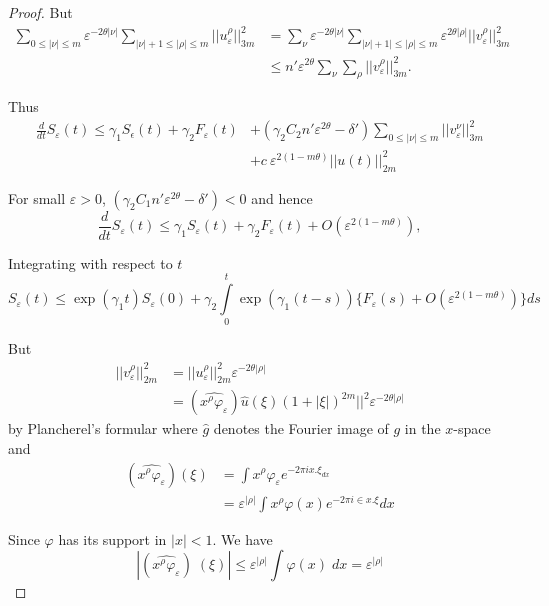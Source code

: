\begin{proof}
But
\begin{align*}
\sum_{0\leq|\nu|\leq m} \varepsilon^{-2 \theta |\nu|}
\sum_{|\nu|+1\leq|\rho|\leq m} || u^\rho_\varepsilon||^2_{3m} & =
\sum_\nu \varepsilon^{-2\theta|\nu|} \sum_{|\nu|+1|\leq|\rho|\leq m}
\varepsilon^{2 \theta |\rho|} || v^\rho _\varepsilon||^2_{3m}\\
&  \leq n' \varepsilon^{2 \theta} \sum_\nu \sum_\rho
||v^\rho_\varepsilon||^2_{3m}. 
\end{align*}

Thus 
\begin{align*}
\frac{d}{dt} S_\varepsilon (t) \leq \gamma_1 S_{\epsilon}(t) + \gamma _2
F_\varepsilon(t) & + (\gamma_2 C_2 n' \varepsilon^{2 \theta} - \delta' )
\sum_{0 \leq |\nu | \leq m} || v^\nu_\varepsilon ||^2_{3m}\\ 
&	+ c\ \varepsilon^{2 (1-m \theta )} || u(t) ||^2_{2m} 
\end{align*}

For small $\varepsilon > 0$, $(\gamma_2 C_1  n' \varepsilon^{2
   \theta} - \delta') < 0 $ and hence   
 $$
\frac{d}{dt} S_\varepsilon(t) \leq \gamma_1 S_\varepsilon(t) + 
\gamma_2 F_\varepsilon(t) + O (\varepsilon^{2 (1- m \theta)}), 
$$

Integrating with respect to $t$
\begin{equation*}
S_\varepsilon (t) \leq \exp (\gamma _1 t) S_\varepsilon (0) + \gamma_2
\int\limits^t_0 \exp (\gamma_1 (t-s)) \Big\{F_\varepsilon (s) +
O(\varepsilon^{2(1-m \theta )})\Big\} ds \tag{2.16} \label{chap4-eq2.16}
\end{equation*}\pageoriginale

But
\begin{align*}
 || v^\rho_\varepsilon||^2_{2m} & = ||
u^\rho_\varepsilon||^2_{2m} \varepsilon^{-2 \theta | \rho |} \\ 
& = (\widehat{x^\rho \varphi_\varepsilon}) \hat{u}(\xi)  (1 + |\xi
|)^{2m} ||^2 \varepsilon^{-2 \theta | \rho |} 
\end{align*}
by Plancherel's formular where $\hat{g}$ denotes the Fourier image of
$g$ in the $x$-space and 
 \begin{align*}
 (\widehat{x^\rho \varphi_\varepsilon}) (\xi ) & = \int x^\rho
   \varphi_\varepsilon e^{-2 \pi ix . \xi_{dx}} \\ 
 & = \varepsilon^{|\rho|} \int x^\rho \varphi (x) e^{-2 \pi i
     \in x. \xi} dx 
 \end{align*}

Since $\varphi$ has its support in $| x |< 1$. We have  
$$
|(\widehat{x^\rho \varphi_\varepsilon}) \; (\xi )| \leq
\varepsilon^{|\rho|}\int\varphi (x) \; dx = \varepsilon^{|\rho |} 
$$


\end{proof}
